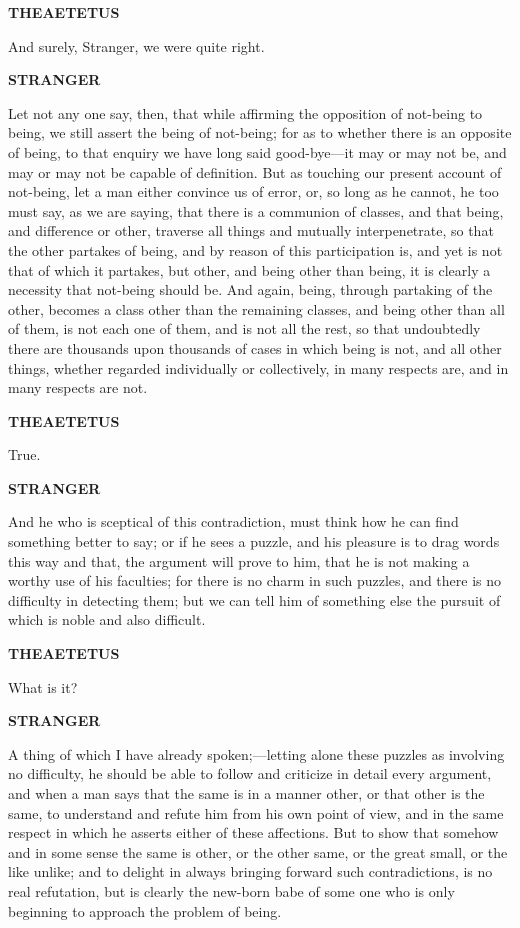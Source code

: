 \documentclass[11pt,letter]{article}
\begin{document}
\par \textbf{THEAETETUS}
\par   And surely, Stranger, we were quite right.

\par \textbf{STRANGER}
\par   Let not any one say, then, that while affirming the opposition of not-being to being, we still assert the being of not-being; for as to whether there is an opposite of being, to that enquiry we have long said good-bye—it may or may not be, and may or may not be capable of definition. But as touching our present account of not-being, let a man either convince us of error, or, so long as he cannot, he too must say, as we are saying, that there is a communion of classes, and that being, and difference or other, traverse all things and mutually interpenetrate, so that the other partakes of being, and by reason of this participation is, and yet is not that of which it partakes, but other, and being other than being, it is clearly a necessity that not-being should be. And again, being, through partaking of the other, becomes a class other than the remaining classes, and being other than all of them, is not each one of them, and is not all the rest, so that undoubtedly there are thousands upon thousands of cases in which being is not, and all other things, whether regarded individually or collectively, in many respects are, and in many respects are not.

\par \textbf{THEAETETUS}
\par   True.

\par \textbf{STRANGER}
\par   And he who is sceptical of this contradiction, must think how he can find something better to say; or if he sees a puzzle, and his pleasure is to drag words this way and that, the argument will prove to him, that he is not making a worthy use of his faculties; for there is no charm in such puzzles, and there is no difficulty in detecting them; but we can tell him of something else the pursuit of which is noble and also difficult.

\par \textbf{THEAETETUS}
\par   What is it?

\par \textbf{STRANGER}
\par   A thing of which I have already spoken;—letting alone these puzzles as involving no difficulty, he should be able to follow and criticize in detail every argument, and when a man says that the same is in a manner other, or that other is the same, to understand and refute him from his own point of view, and in the same respect in which he asserts either of these affections. But to show that somehow and in some sense the same is other, or the other same, or the great small, or the like unlike; and to delight in always bringing forward such contradictions, is no real refutation, but is clearly the new-born babe of some one who is only beginning to approach the problem of being.
\end{document}
